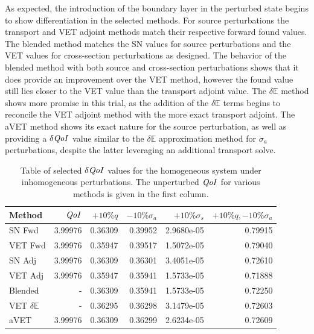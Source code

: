 \documentclass[12pt]{report}
\newcommand{\Edd}{\mathbb{E}}
\newcommand{\sigs}{\sigma_s}
\newcommand{\siga}{\sigma_a}
\newcommand{\qoi}{{\it QoI}\xspace}
\begin{document}
As expected, the introduction of the boundary layer in the perturbed state begins to show differentiation in the selected methods. For source perturbations the transport and VET adjoint methods match their respective forward found values. The blended method matches the SN values for source perturbations and the VET values for cross-section perturbations as designed. The behavior of the blended method with both source and cross-section perturbations shows that it does provide an improvement over the VET method, however the found value still lies closer to the VET value than the transport adjoint value. The $\delta \Edd$ method shows more promise in this trial, as the addition of the $\delta \Edd$ terms begins to reconcile the VET adjoint method with the more exact transport adjoint. The aVET method shows its exact nature for the source perturbation, as well as providing a $\delta \qoi$ value similar to the $\delta \Edd$ approximation method for $\siga$ perturbations, despite the latter leveraging an additional transport solve. 

\begin{table}[H]
\centering
  \begin{tabular}{| l | r || r | r | r | r |}
    \hline
    Method  & $\qoi$ & $+10\% q $  & $-10\% \siga $ & $+10\% \sigs $ & $+10\% q,-10\% \siga$ \\ \hline
     SN Fwd 			&3.99976	&0.36309 &0.39952 &2.9680e-05 & 0.79915\\ \hline
     VET Fwd			&3.99976	&0.35947 &0.39517 &1.5072e-05 &0.79040\\ \hline
     SN Adj  			&3.99976	&0.36309 &0.36301 &3.4051e-05 &0.72610\\ \hline
     VET Adj 			&3.99976	&0.35947 &0.35941 &1.5733e-05 &0.71888\\ \hline
     Blended 			&-			&0.36309 &0.35941 &1.5733e-05 &0.72250\\ \hline
     VET $\delta \Edd$ 	&-			&0.36295 &0.36298 &3.1479e-05 &0.72603\\ \hline
     aVET				&3.99976	&0.36309 &0.36299 &2.6234e-05 &0.72609\\ \hline
    \end{tabular}
  \caption{Table of selected $\delta \qoi$ values for the homogeneous system under inhomogeneous perturbations. The unperturbed $\qoi$ for various methods is given in the first column.}
  \label{TableT2}
\end{table}

\end{document}
